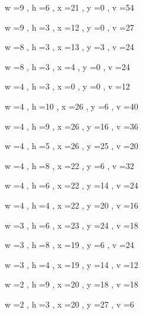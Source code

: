 \documentclass[11pt]{article}
\begin{document}
w =9 , h =6 , x =21 , y =0 , v =54
\par
w =9 , h =3 , x =12 , y =0 , v =27
\par
w =8 , h =3 , x =13 , y =3 , v =24
\par
w =8 , h =3 , x =4 , y =0 , v =24
\par
w =4 , h =3 , x =0 , y =0 , v =12
\par
w =4 , h =10 , x =26 , y =6 , v =40
\par
w =4 , h =9 , x =26 , y =16 , v =36
\par
w =4 , h =5 , x =26 , y =25 , v =20
\par
w =4 , h =8 , x =22 , y =6 , v =32
\par
w =4 , h =6 , x =22 , y =14 , v =24
\par
w =4 , h =4 , x =22 , y =20 , v =16
\par
w =3 , h =6 , x =23 , y =24 , v =18
\par
w =3 , h =8 , x =19 , y =6 , v =24
\par
w =3 , h =4 , x =19 , y =14 , v =12
\par
w =2 , h =9 , x =20 , y =18 , v =18
\par
w =2 , h =3 , x =20 , y =27 , v =6
\par
\newpage
\end{document}
